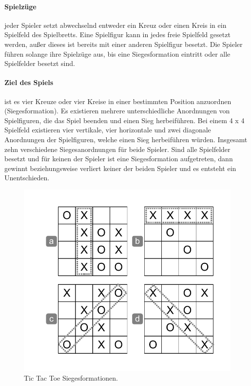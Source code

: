 \paragraph{Spielzüge} jeder Spieler setzt abwechselnd entweder ein Kreuz oder einen Kreis in ein Spielfeld des Spielbretts. Eine Spielfigur kann in jedes freie Spielfeld gesetzt werden, außer dieses ist bereits mit einer anderen Spielfigur besetzt. Die Spieler führen solange ihre Spielzüge aus, bis eine Siegesformation eintritt oder alle Spielfelder besetzt sind. 

\paragraph{Ziel des Spiels} ist es vier Kreuze oder vier Kreise in einer bestimmten Position anzuordnen (Siegesformation). Es existieren mehrere unterschiedliche Anordnungen von Spielfiguren, die das Spiel beenden und einen Sieg herbeiführen. Bei einem 4 x 4 Spielfeld existieren vier vertikale, vier horizontale und zwei diagonale Anordnungen der Spielfiguren, welche einen Sieg herbeiführen würden. Insgesamt zehn verschiedene Siegesanordnungen für beide Spieler. Sind alle Spielfelder besetzt und für keinen der Spieler ist eine Siegesformation aufgetreten, dann gewinnt beziehungsweise verliert keiner der beiden Spieler und es entsteht ein Unentschieden. \\

\begin{figure}[!htbp]
  \centering
  \includegraphics[scale = 0.6]{inhalt/abbildungen/siegesbedingungen_tictactoe.pdf}
  \caption{Tic Tac Toe Siegesformationen.}
  \label{fig:siegesbedingungen_tictactoe}
\end{figure}

